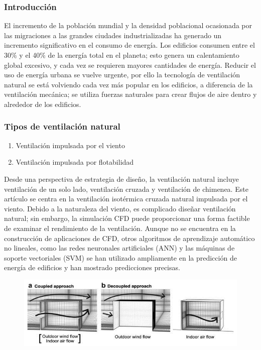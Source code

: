 \documentclass[10pt]{beamer}
\begin{document}
\begin{frame}
\frametitle{Introducción}
El incremento de la población mundial y la densidad poblacional ocasionada por las migraciones a las grandes ciudades industrializadas ha generado un incremento significativo en el consumo de energía. Los edificios consumen entre el 30\% y el 40\% de la energía total en el planeta; esto genera un calentamiento global excesivo, y cada vez se requieren mayores cantidades de energía. Reducir el uso de energía urbana se vuelve urgente, por ello la tecnología de ventilación natural se está volviendo cada vez más popular en los edificios, a diferencia de la ventilación mecánica; se utiliza fuerzas naturales para crear flujos de aire dentro y alrededor de los edificios.
\end{frame}
\begin{frame}
\frametitle{Tipos de ventilación natural}
\begin{enumerate}
\item Ventilación impulsada por el viento
\item Ventilación impulsada por flotabilidad
\end{enumerate}
Desde una perspectiva de estrategia de diseño, la ventilación natural incluye ventilación de un solo lado, ventilación cruzada y ventilación de chimenea. Este artículo se centra en la ventilación isotérmica cruzada natural impulsada por el viento. Debido a la naturaleza del viento, es complicado diseñar ventilación natural; sin embargo, la simulación CFD puede proporcionar una forma factible de examinar el rendimiento de la ventilación. Aunque no se encuentra en la construcción de aplicaciones de CFD, otros algoritmos de aprendizaje automático no lineales, como las redes neuronales artificiales (ANN) y las máquinas de soporte vectoriales (SVM) se han utilizado ampliamente en la predicción de energía de edificios y han mostrado predicciones precisas.
\begin{figure}
\centering
\includegraphics[scale=0.3]{inoutdoot.png}
\end{figure}
\end{frame}
\end{document}
